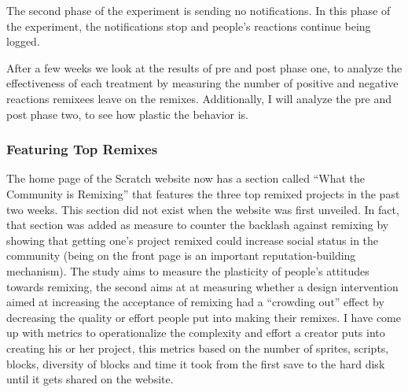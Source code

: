The second phase of the experiment is sending no notifications. In this phase of the experiment, the notifications stop and people's reactions continue being logged.

After a few weeks we look at the results of pre and post phase one, to analyze the effectiveness of each treatment by measuring the number of positive and negative reactions remixees leave on the remixes. 
Additionally, I will analyze the pre and post phase two, to see how plastic the behavior is.

\subsubsection{Featuring Top Remixes}
The home page of the Scratch website now has a section called ``What the Community is Remixing''  that features the three top remixed projects in the past two weeks.
This section did not exist when the website was first unveiled.
In fact, that section was added as measure to counter the backlash against remixing by showing that getting one's project remixed could increase social status in the community (being on the front page is an important reputation-building mechanism).
The study aims to measure the plasticity of people's attitudes towards remixing, the second aims at at measuring whether a design intervention aimed at increasing the acceptance of remixing had a ``crowding out'' effect by decreasing the quality or effort people put into making their remixes.
I have come up with metrics to operationalize the complexity and effort a creator puts into creating his or her project, this metrics based on the number of sprites, scripts, blocks, diversity of blocks and time it took from the first save to the hard disk until it gets shared on the website.

